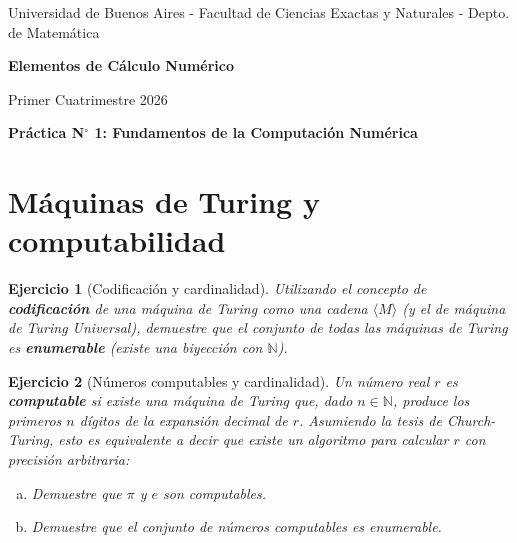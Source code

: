 \documentclass[12pt]{article}
\newtheorem{exercise}{Ejercicio}
\begin{document}
\centerline{{\small Universidad de Buenos Aires - Facultad de Ciencias Exactas y Naturales - Depto. de Matemática}}
 
 \vskip 0.2cm
 \hrulefill
 \vskip 0.2cm

 \centerline{{\bf\Huge {\sc Elementos de Cálculo Numérico}}}
 \vskip 0.2cm
 \centerline{\ttfamily Primer Cuatrimestre 2026}
 \hrulefill

 \bigskip
 \centerline{\bf Práctica N$^\circ$ 1: Fundamentos de la Computación Numérica}
 \bigskip


\section*{Máquinas de Turing y computabilidad}

\begin{exercise}[Codificación y cardinalidad] Utilizando el concepto de \textbf{codificación} de una máquina de Turing como una cadena $\langle M \rangle$ (y el de máquina de Turing Universal), demuestre que el conjunto de todas las máquinas de Turing es \textbf{enumerable} (existe una biyección con $\mathbb{N}$).
\end{exercise}

\begin{exercise}[Números computables y cardinalidad]
Un número real $r$ es \textbf{computable} si existe una máquina de Turing que, dado $n \in \mathbb{N}$, produce los primeros $n$ dígitos de la expansión decimal de $r$. Asumiendo la tesis de Church-Turing, esto es equivalente a decir que existe un algoritmo para calcular $r$ con precisión arbitraria:
\begin{enumerate}[(a)]
\item Demuestre que $\pi$ y $e$ son computables.
\item Demuestre que el conjunto de números computables es enumerable.
\end{enumerate}
\end{exercise}
\end{document}
